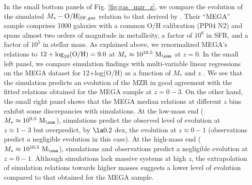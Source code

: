 \documentclass[useAMS,usenatbib]{mn2e}
\begin{document}
In the small bottom panels of Fig. \ref{fig:gas_mzr_z}, we compare the evolution of the simulated 
$M_* - {\rm O/H}|_{\rm SF,gas}$ relation to
that derived by \citet{hunt2016}.
Their ``MEGA'' sample comprises 1000 galaxies with a common O/H calibration (PP04 N2) and
spans almost two orders of magnitude in metallicity, a factor of $10^6$ in SFR, and a
factor of $10^5$ in stellar mass. As explained above, 
we renormalized MEGA's relations to $12+ {\log}_{\rm 10} ({\rm O/H}) = 9.0$
at $M_* \approx 10^{10.5} \ {\rm M}_{\sun}$ at $z=0$.
In the small left panel, we compare simulation findings with  
multi-variable linear regressions on the MEGA dataset for 12+log(O/H) as a function of $M_*$ and 
$z$ \citep[see][for details]{hunt2016}.
We see that the simulation predicts an evolution of the MZR
in good agreement with the fitted relations obtained for the MEGA sample at $z=0-3$.
On the other hand, the small right panel shows that the MEGA median relations at different $z$ bins
exhibit some discrepancies with simulations. At the low-mass end 
($M_* \approx 10^{9.5} \ {\rm M}_{\sun}$), simulations predict the
observed level of evolution at $z \approx 1-3$ but overpredict, by $\la 0.2$ dex, the evolution
at $z \approx 0-1$ (observations predict a negligible evolution in this case).
At the high-mass end ($M_* \approx 10^{10.5} \ {\rm M}_{\sun}$), simulations and observations
predict a negligible evolution at $z=0-1$.  Although simulations lack massive systems at
high $z$, the extrapolation of simulation relations towards higher masses suggests a lower
level of evolution compared to that obtained for the MEGA sample. 
\end{document}
